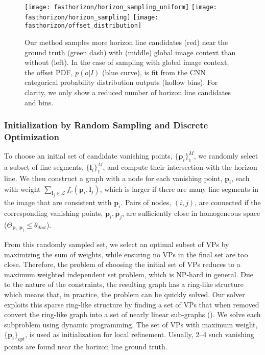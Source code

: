 \begin{figure}
  \centering
  \texttt{[image: fasthorizon/horizon\_sampling\_uniform]}
  \texttt{[image: fasthorizon/horizon\_sampling]}
  \texttt{[image: fasthorizon/offset\_distribution]}
  \caption{Our method samples more horizon line candidates (red) near
    the ground truth (green dash) with (middle) global image context
    than without (left).  In the case of sampling with global image
    context, the offset PDF, $p(o|I)$ (blue curve), is fit from the
    CNN categorical probability distribution outputs (hollow
    bins). For clarity, we only show a reduced number of horizon line
    candidates and bins.}
  \label{fig:horsampling}
\end{figure}

\subsubsection{Initialization by Random Sampling and Discrete
Optimization}
\label{sec:initialization}

To choose an initial set of candidate vanishing points,
$\{\mathbf{p}_i\}_1^M$, we randomly select a subset of line segments,
$\{\mathbf{l}_i\}_1^M$, and compute their intersection with the horizon
line.  We then construct a graph with a node for each vanishing point,
$\mathbf{p}_i$, each with weight $\sum_{\mathbf{l}_j \in \mathcal{L}}f_c(\mathbf{p}_i,
\mathbf{l}_j)$, which is larger if there are many line segments in the image
that are consistent with $\mathbf{p}_i$. Pairs of nodes, $(i,j)$, are
connected if the corresponding vanishing points, $\mathbf{p}_i, \mathbf{p}_j$, are
sufficiently close in homogeneous space ($\Theta_{\mathbf{p}_i,\mathbf{p}_j} \le
\theta_{dist}$).

From this randomly sampled set, we select an optimal subset of VPs by
maximizing the sum of weights, while ensuring no VPs in the final set
are too close.  Therefore, the problem of choosing the initial set of
VPs reduces to a maximum weighted independent set problem, which is
NP-hard in general. Due to the nature of the constraints, the
resulting graph has a ring-like structure which means that, in
practice, the problem can be quickly solved. Our solver exploits this
sparse ring-like structure by finding a set of VPs that when removed
convert the ring-like graph into a set of nearly linear sub-graphs
(). We solve each subproblem using dynamic
programming. The set of VPs with maximum weight, $\{\mathbf{p}_i\}_{opt}$,
is used as initialization for local refinement. Usually, 2--4 such
vanishing points are found near the horizon line ground truth.

